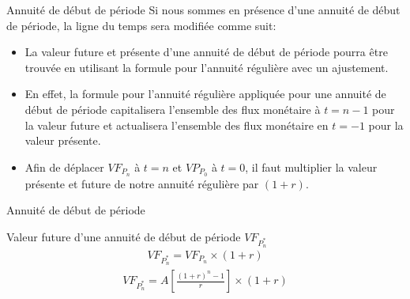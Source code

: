\documentclass{beamer}
\begin{document}
\begin{frame}{Annuité de début de période}
Si nous sommes en présence d'une annuité de début de période, la ligne du temps sera modifiée comme suit: \\

\begin{itemize}
\item La valeur future et présente d'une annuité de début de période pourra être trouvée en utilisant la formule pour l'annuité régulière avec un ajustement. 
\item En effet, la formule pour l'annuité régulière appliquée pour une annuité de début de période capitalisera l'ensemble des flux monétaire à $t=n-1$ pour la valeur future et actualisera l'ensemble des flux monétaire en $t=-1$ pour la valeur présente. 
\item Afin de déplacer $VF_{P_n}$ à $t=n$ et $VP_{P_0}$ à $t=0$, il faut multiplier la valeur présente et future de notre annuité régulière par $(1+r)$.
\end{itemize}
\end{frame}

\begin{frame}{Annuité de début de période}
\begin{block}{Valeur future d'une annuité de début de période $VF_{P_n^*}$}
\begin{align*}
VF_{P_n^*}=VF_{P_n} \times (1+r)
\end{align*}
\begin{align*}
VF_{P_n^*}=A \left[\frac{(1+r)^n-1}{r} \right] \times (1+r)
\end{align*}
\end{block}
\end{frame}
\end{document}
